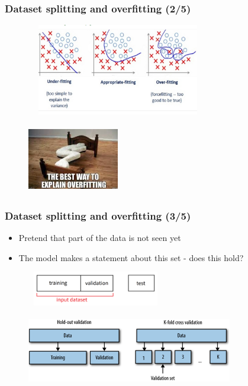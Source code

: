 \documentclass{beamer}
\begin{document}
\begin{frame}
\frametitle{Dataset splitting and overfitting (2/5)}

\begin{figure}
  \includegraphics[width=8cm, height=4cm]{figures/OverFitting_1.png}
\end{figure}

\begin{figure}
  \includegraphics[width=4cm, height=3cm]{figures/OverFitting_2.jpg}
\end{figure}

\end{frame}

\begin{frame}
\frametitle{Dataset splitting and overfitting (3/5)}

\begin{itemize}
\item Pretend that part of the data is not seen yet
\item The model makes a statement about this set - does this hold?
\end{itemize}

\begin{figure}
  \includegraphics[width=6cm, height=1.5cm]{figures/TrainingValidationTestSet.png}
\end{figure}

\begin{figure}
  \includegraphics[width=9cm, height=3cm]{figures/K-Fold_CrossValidation.png}
\end{figure}

\end{frame}
\end{document}
